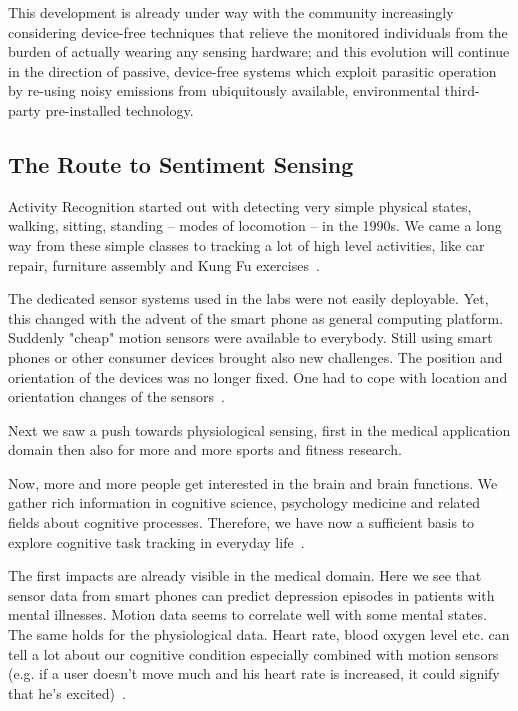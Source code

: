 \documentclass[journal]{IEEEtran}
\begin{document}
This development is already under way with the community increasingly considering device-free techniques that relieve the monitored individuals from the burden of actually wearing any sensing hardware; and this evolution will continue in the direction of passive, device-free systems which exploit parasitic operation by re-using noisy emissions from ubiquitously available, environmental third-party pre-installed technology.

\subsection{The Route to Sentiment Sensing}
Activity Recognition started out with detecting very simple
physical states, walking, sitting, standing -- modes of locomotion -- in the 1990s. We came a long way from these simple classes to tracking a lot of high level activities, like car repair,
furniture assembly and Kung Fu exercises~\cite{Antifakos:2002p8030,heinz2006uws}.

The dedicated sensor systems used in the labs were not easily deployable. 
Yet, this changed with the advent of the smart phone as general computing platform. Suddenly "cheap" motion sensors
were available to everybody. Still using smart phones or
other consumer devices brought also new challenges.
The position and orientation of the devices was no longer fixed.
One had to cope with location and orientation changes
of the sensors~\cite{kunze2008dsd}.

Next we saw a push towards physiological sensing, first in the
medical application domain then also for more and more
sports and fitness research.

Now, more and more people get interested in the brain and brain
functions. We gather rich information in cognitive science,
psychology medicine and related fields about cognitive
processes. Therefore, we have now a sufficient basis to explore
cognitive task tracking in everyday life~\cite{kunze2013activity}.

The first impacts are already visible in the medical domain.
Here we see that sensor data from smart phones can predict depression episodes in patients with mental illnesses.
Motion data seems to correlate well with some mental states.
The same holds for the physiological data. Heart rate, blood oxygen level etc. can tell a lot about our cognitive condition especially combined with motion sensors
(e.g. if a user doesn't move much and his heart rate is increased, it could signify that he's excited)~\cite{matthews2007wearable}.
\end{document}

